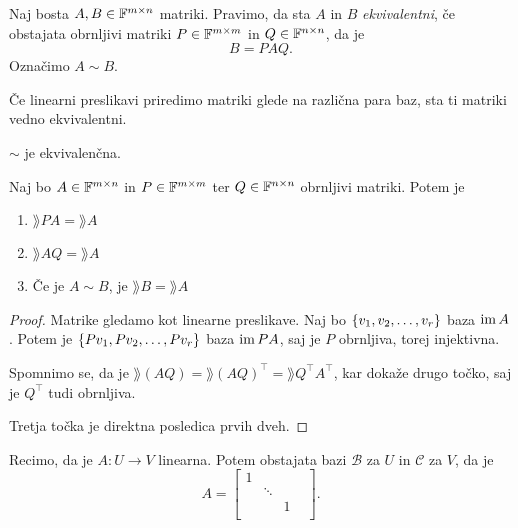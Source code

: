 \documentclass[12pt, a4paper]{article}
\begin{document}
\begin{definicija}
Naj bosta $A,B\in\mathbb{F}^{m\times n}$ matriki. Pravimo, da sta $A$ in $B$ \emph{ekvivalentni}, če obstajata obrnljivi matriki $P\in\mathbb{F}^{m\times m}$ in $Q\in\mathbb{F}^{n\times n}$, da je
\[
B=PAQ.
\]
Označimo $A\sim B$.
\end{definicija}

\begin{opomba}
Če linearni preslikavi priredimo matriki glede na različna para baz, sta ti matriki vedno ekvivalentni.
\end{opomba}

\begin{posledica}
$\sim$ je ekvivalenčna.
\end{posledica}

\obvs

\begin{lema}
Naj bo $A\in\mathbb{F}^{m\times n}$ in $P\in\mathbb{F}^{m\times m}$ ter $Q\in\mathbb{F}^{n\times n}$ obrnljivi matriki. Potem je

\begin{enumerate}[label=\alph*)]
\item $\rang PA=\rang A$
\item $\rang AQ=\rang A$
\item Če je $A\sim B$, je $\rang B=\rang A$
\end{enumerate}
\end{lema}

\begin{proof}
Matrike gledamo kot linearne preslikave. Naj bo $\left\{v_1,v_2,\dots,v_r\right\}$ baza $\operatorname{im} A$. Potem je $\left\{Pv_1,Pv_2,\dots,Pv_r\right\}$ baza $\operatorname{im} PA$, saj je $P$ obrnljiva, torej injektivna.

Spomnimo se, da je $\rang(AQ)=\rang(AQ)^\top=\rang Q^\top A^\top$, kar dokaže drugo točko, saj je $Q^\top$ tudi obrnljiva.

Tretja točka je direktna posledica prvih dveh.
\end{proof}

\begin{lema}
Recimo, da je $A\colon U\to V$ linearna. Potem obstajata bazi $\mathcal{B}$ za $U$ in $\mathcal{C}$ za $V$, da je
\[
A=\begin{bmatrix}
1 &        &   &   \\ 
  & \ddots &   &   \\ 
  &        & 1 &   \\ 
  &        &   &  
\end{bmatrix}.
\]
\end{lema}
\end{document}

